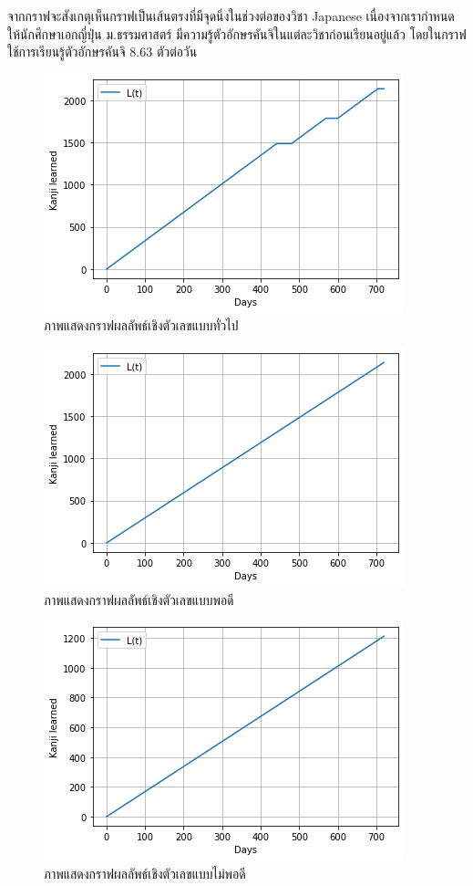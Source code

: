 \documentclass{article}
\begin{document}
จากกราฟจะสังเกตุเห็นกราฟเป็นเส้นตรงที่มีจุดนิ่งในช่วงต่อของวิชา Japanese เนื่องจากเรากำหนดให้นักศึกษาเอกญี่ปุ่น ม.ธรรมศาสตร์ มีความรู้ตัวอักษรคันจิในแต่ละวิชาก่อนเรียนอยู่แล้ว โดยในกราฟใช้การเรียนรู้ตัวอักษรคันจิ 8.63 ตัวต่อวัน 

\begin{figure}
\centering
\includegraphics[scale=0.75]{2.png}
\caption{ภาพแสดงกราฟผลลัพธ์เชิงตัวเลขแบบทั่วไป}
\label{fig:graph1}
\end{figure}

\begin{figure}
\centering
\includegraphics[scale=0.75]{3.png}
\caption{ภาพแสดงกราฟผลลัพธ์เชิงตัวเลขแบบพอดี}
\label{fig:graph2}
\end{figure}

\begin{figure}
\centering
\includegraphics[scale=0.75]{4.png}
\caption{ภาพแสดงกราฟผลลัพธ์เชิงตัวเลขแบบไม่พอดี}
\label{fig:graph3}
\end{figure}
\end{document}
